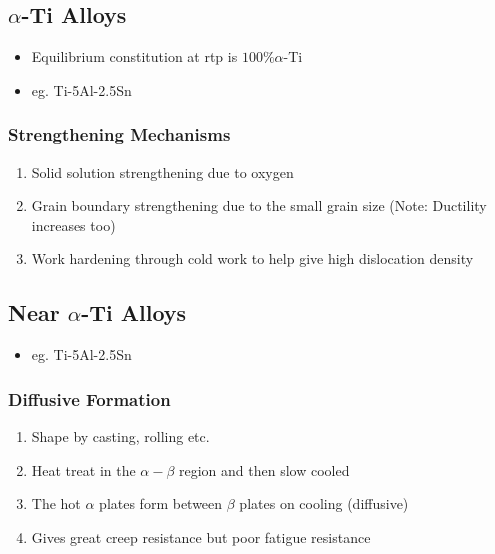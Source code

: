 \subsection{$\alpha$-Ti Alloys} %
\label{sub:alpha_alloys}
\begin{itemize}
  \item Equilibrium constitution at rtp is $100\% \alpha$-Ti
  \item eg. Ti-5Al-2.5Sn
\end{itemize}

\subsubsection{Strengthening Mechanisms} %
\label{ssub:strengthening_mechanisms}

\begin{enumerate}
  \item Solid solution strengthening due to oxygen
  \item Grain boundary strengthening due to the small grain size (Note: Ductility increases too)
  \item Work hardening through cold work to help give high dislocation density
\end{enumerate}


\subsection{Near $\alpha$-Ti Alloys} %
\label{sub:near_}

\begin{itemize}
  \item eg. Ti-5Al-2.5Sn
\end{itemize}

\subsubsection{Diffusive Formation} %
\label{ssub:formation}

\begin{enumerate}
  \item Shape by casting, rolling etc.
  \item Heat treat in the $\alpha-\beta$ region and then slow cooled
  \item The hot $\alpha$ plates form between $\beta$ plates on cooling (diffusive)
  \item Gives great creep resistance but poor fatigue resistance
\end{enumerate}

